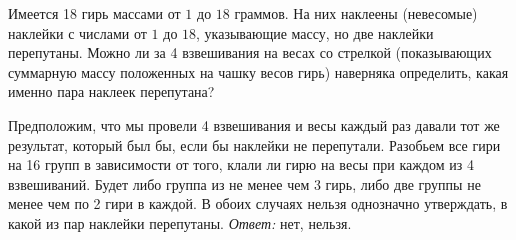 Имеется 18 гирь массами от $1$ до $18$ граммов.
На них наклеены (невесомые) наклейки с числами от $1$ до $18$, указывающие
массу, но две наклейки перепутаны.
Можно ли за 4 взвешивания на весах со стрелкой
(показывающих суммарную массу положенных на чашку весов гирь)
наверняка определить, какая именно пара наклеек перепутана?

\solution
Предположим, что мы провели 4 взвешивания и весы каждый раз давали тот же
результат, который был бы, если бы наклейки не перепутали.
Разобьем все гири на 16 групп в зависимости от того, клали ли гирю на весы при
каждом из 4 взвешиваний.
Будет либо группа из не менее чем 3 гирь, либо две группы не менее чем по 2
гири в каждой.
В обоих случаях нельзя однозначно утверждать, в какой из пар наклейки
перепутаны.
\emph{Ответ:}
нет, нельзя.


